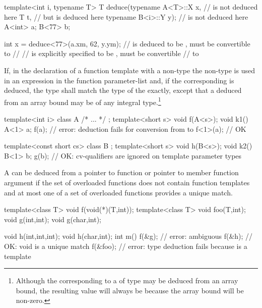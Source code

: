 \begin{codeblock}
template<int i, typename T>
T deduce(typename A<T>::X x,	//  is not deduced here
		  T	  t,	// but  is deduced here
	 typename B<i>::Y y);	//  is not deduced here
A<int> a;
B<77>  b;

int    x = deduce<77>(a.xm, 62, y.ym);
//  is deduced to be ,  must be convertible to
// 
//  is explicitly specified to be ,  must be convertible
// to 
\end{codeblock}
\exitnoteb

\pnum
If, in the declaration of a function template with a non-type
the non-type
is used in an expression in the function parameter-list and,
if the corresponding
is deduced, the
type shall match the type of the
exactly, except that a
deduced from an array bound may be of any integral type.\footnote{Although the
corresponding to a
of type
may be deduced from an array bound, the resulting value will always be
because the array bound will be non-zero.}
\enterexample

\begin{codeblock}
template<int i> class A { /* ... */ };
template<short s> void f(A<s>);
void k1() {
    A<1> a;
    f(a);			// error: deduction fails for conversion from  to 
    f<1>(a);			// OK
}

template<const short cs> class B { };
template<short s> void h(B<s>);
void k2() {
    B<1> b;
    g(b);			// OK: cv-qualifiers are ignored on template parameter types
}
\end{codeblock}
\exitexampleb

\pnum
A
can be deduced from a pointer to function or pointer to member function
argument if the set of overloaded functions does not contain function
templates and at most one of a set of overloaded functions provides a
unique match.
\enterexample

\begin{codeblock}
template<class T> void f(void(*)(T,int));
template<class T> void foo(T,int);
void g(int,int);
void g(char,int);

void h(int,int,int);
void h(char,int);
int m()
{
	f(&g);			// error: ambiguous
	f(&h);			// OK: void  is a unique match
	f(&foo);		// error: type deduction fails because  is a template
}
\end{codeblock}
\exitexampleb

